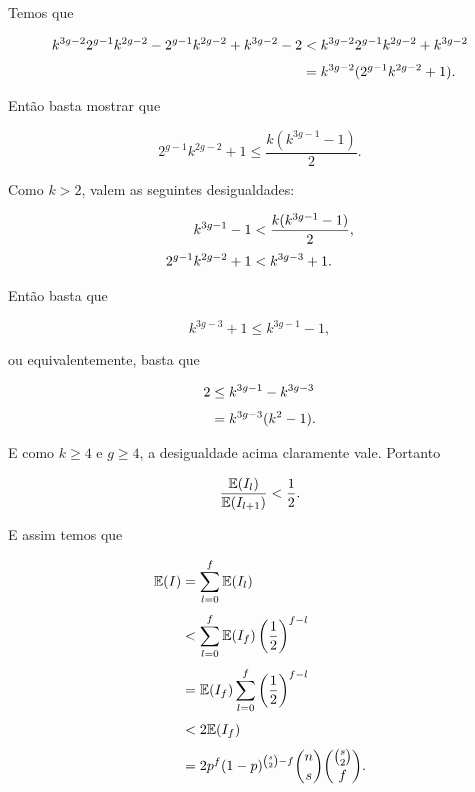 Temos que

\begin{equation*}
\setlength{\jot}{6pt}
\begin{aligned}
k^{3g-2}2^{g-1}k^{2g-2}-2^{g-1}k^{2g-2} + k^{3g-2}-2 &< k^{3g-2}2^{g-1}k^{2g-2} + k^{3g-2} \\
&= k^{3g-2}(2^{g-1}k^{2g-2}+1).
\end{aligned}
\end{equation*}

Então basta mostrar que

\[2^{g-1}k^{2g-2}+1 \leq \frac{k(k^{3g-1}-1)}{2}.\]

Como $k>2$, valem as seguintes desigualdades:

\begin{equation*}
\setlength{\jot}{6pt}
\begin{aligned}
k^{3g-1}-1 &< \frac{k(k^{3g-1}-1)}{2}, \\
2^{g-1}k^{2g-2}+1 &< k^{3g-3}+1.
\end{aligned}
\end{equation*}

Então basta que

\[k^{3g-3}+1 \leq k^{3g-1}-1,\]

ou equivalentemente, basta que

\begin{equation*}
\setlength{\jot}{6pt}
\begin{aligned}
2 &\leq k^{3g-1} - k^{3g-3} \\
&= k^{3g-3}(k^2 - 1).
\end{aligned}
\end{equation*}

E como $k \geq 4$ e $g \geq 4$, a desigualdade acima claramente vale. Portanto

\[\frac{\mathbb{E}(I_l)}{\mathbb{E}(I_{l+1})} < \frac{1}{2}.\]

E assim temos que

\begin{equation*}
\setlength{\jot}{6pt}
\begin{aligned}
\bbe(I) &= \sum\limits_{l=0}^{f}\bbe(I_l) \\
&< \sum\limits_{l=0}^{f} \bbe(I_f)\left(\frac{1}{2}\right)^{f-l} \\
&= \bbe(I_f)\sum\limits_{l=0}^{f} \left(\frac{1}{2}\right)^{f-l} \\
&< 2\bbe(I_f) \\
&= 2p^f(1-p)^{\binom{s}{2}-f}\binom{n}{s}\binom{\binom{s}{2}}{f}.
\end{aligned}
\end{equation*}


